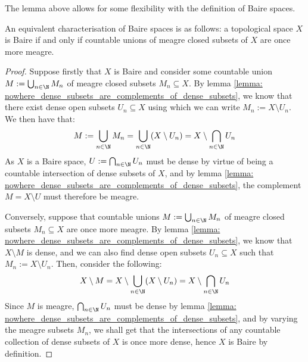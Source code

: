         The lemma above allows for some flexibility with the definition of Baire spaces.
        \begin{lemma} \label{lemma: baire_spaces_via_meagre_subsets}
            An equivalent characterisation of Baire spaces is as follows: a topological space $X$ is Baire if and only if countable unions of meagre closed subsets of $X$ are once more meagre. 
        \end{lemma}
            \begin{proof}
                Suppose firstly that $X$ is Baire and consider some countable union $M := \bigcup_{n \in \N} M_n$ of meagre closed subsets $M_n \subseteq X$. By lemma \ref{lemma: nowhere_dense_subsets_are_complements_of_dense_subsets}, we know that there exist dense open subsets $U_n \subseteq X$ using which we can write $M_n := X \setminus U_n$. We then have that:
                    $$M := \bigcup_{n \in \N} M_n = \bigcup_{n \in \N} (X \setminus U_n) = X \setminus \bigcap_{n \in \N} U_n$$
                As $X$ is a Baire space, $U := \bigcap_{n \in \N} U_n$ must be dense by virtue of being a countable intersection of dense subsets of $X$, and by lemma \ref{lemma: nowhere_dense_subsets_are_complements_of_dense_subsets}, the complement $M = X \setminus U$ must therefore be meagre.

                Conversely, suppose that countable unions $M := \bigcup_{n \in \N} M_n$ of meagre closed subsets $M_n \subseteq X$ are once more meagre. By lemma \ref{lemma: nowhere_dense_subsets_are_complements_of_dense_subsets}, we know that $X \setminus M$ is dense, and we can also find dense open subsets $U_n \subseteq X$ such that $M_n := X \setminus U_n$. Then, consider the following:
                    $$X \setminus M = X \setminus \bigcup_{n \in \N} (X \setminus U_n) = X \setminus \bigcap_{n \in \N} U_n$$
                Since $M$ is meagre, $\bigcap_{n \in \N} U_n$ must be dense by lemma \ref{lemma: nowhere_dense_subsets_are_complements_of_dense_subsets}, and by varying the meagre subsets $M_n$, we shall get that the intersections of any countable collection of dense subsets of $X$ is once more dense, hence $X$ is Baire by definition.
            \end{proof}
